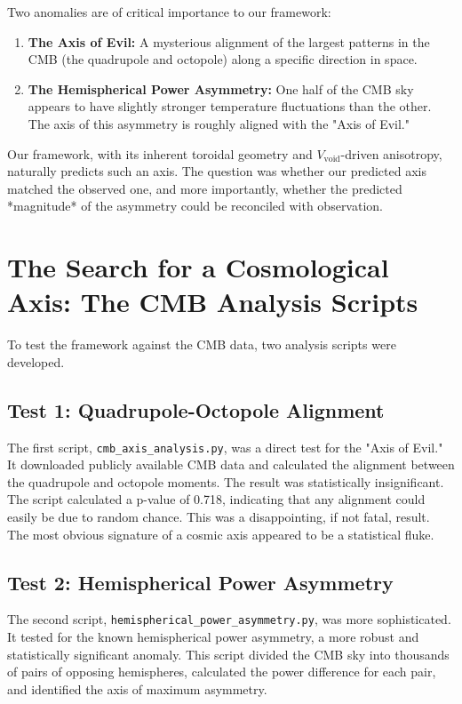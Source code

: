\documentclass[12pt]{report}
\begin{document}
Two anomalies are of critical importance to our framework:
\begin{enumerate}
    \item \textbf{The Axis of Evil:} A mysterious alignment of the largest patterns in the CMB (the quadrupole and octopole) along a specific direction in space.
    \item \textbf{The Hemispherical Power Asymmetry:} One half of the CMB sky appears to have slightly stronger temperature fluctuations than the other. The axis of this asymmetry is roughly aligned with the "Axis of Evil."
\end{enumerate}
Our framework, with its inherent toroidal geometry and $V_{\text{void}}$-driven anisotropy, naturally predicts such an axis. The question was whether our predicted axis matched the observed one, and more importantly, whether the predicted *magnitude* of the asymmetry could be reconciled with observation.

\section{The Search for a Cosmological Axis: The CMB Analysis Scripts}
To test the framework against the CMB data, two analysis scripts were developed.

\subsection{Test 1: Quadrupole-Octopole Alignment}
The first script, \texttt{cmb\_axis\_analysis.py}, was a direct test for the "Axis of Evil." It downloaded publicly available CMB data and calculated the alignment between the quadrupole and octopole moments.
The result was statistically insignificant. The script calculated a p-value of 0.718, indicating that any alignment could easily be due to random chance. This was a disappointing, if not fatal, result. The most obvious signature of a cosmic axis appeared to be a statistical fluke.

\subsection{Test 2: Hemispherical Power Asymmetry}
The second script, \texttt{hemispherical\_power\_asymmetry.py}, was more sophisticated. It tested for the known hemispherical power asymmetry, a more robust and statistically significant anomaly. This script divided the CMB sky into thousands of pairs of opposing hemispheres, calculated the power difference for each pair, and identified the axis of maximum asymmetry.
\end{document}
